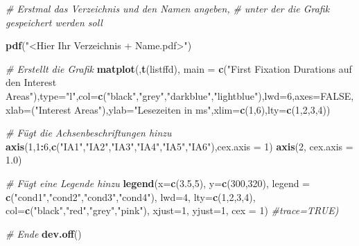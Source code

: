 \documentclass[]{book}
\newenvironment{Shaded}{\begin{snugshade}}{\end{snugshade}}
\newcommand{\KeywordTok}[1]{\textcolor[rgb]{0.13,0.29,0.53}{\textbf{#1}}}
\newcommand{\DataTypeTok}[1]{\textcolor[rgb]{0.13,0.29,0.53}{#1}}
\newcommand{\DecValTok}[1]{\textcolor[rgb]{0.00,0.00,0.81}{#1}}
\newcommand{\FloatTok}[1]{\textcolor[rgb]{0.00,0.00,0.81}{#1}}
\newcommand{\StringTok}[1]{\textcolor[rgb]{0.31,0.60,0.02}{#1}}
\newcommand{\CommentTok}[1]{\textcolor[rgb]{0.56,0.35,0.01}{\textit{#1}}}
\newcommand{\OtherTok}[1]{\textcolor[rgb]{0.56,0.35,0.01}{#1}}
\newcommand{\OperatorTok}[1]{\textcolor[rgb]{0.81,0.36,0.00}{\textbf{#1}}}
\newcommand{\NormalTok}[1]{#1}
\begin{document}
\begin{Shaded}
\begin{Highlighting}[]
\CommentTok{# Erstmal das Verzeichnis und den Namen angeben,}
\CommentTok{# unter der die Grafik gespeichert werden soll}

\KeywordTok{pdf}\NormalTok{(}\StringTok{"<Hier Ihr Verzeichnis + Name.pdf>"}\NormalTok{)}

\CommentTok{# Erstellt die Grafik}
\KeywordTok{matplot}\NormalTok{(,}\KeywordTok{t}\NormalTok{(listffd), }\DataTypeTok{main =} \KeywordTok{c}\NormalTok{(}\StringTok{"First Fixation Durations auf den Interest Areas"}\NormalTok{),}\DataTypeTok{type=}\StringTok{"l"}\NormalTok{,}\DataTypeTok{col=}\KeywordTok{c}\NormalTok{(}\StringTok{"black"}\NormalTok{,}\StringTok{"grey"}\NormalTok{,}\StringTok{"darkblue"}\NormalTok{,}\StringTok{"lightblue"}\NormalTok{),}\DataTypeTok{lwd=}\DecValTok{6}\NormalTok{,}\DataTypeTok{axes=}\OtherTok{FALSE}\NormalTok{,}\DataTypeTok{xlab=}\NormalTok{(}\StringTok{"Interest Areas"}\NormalTok{),}\DataTypeTok{ylab=}\StringTok{"Lesezeiten in ms"}\NormalTok{,}\DataTypeTok{xlim=}\KeywordTok{c}\NormalTok{(}\DecValTok{1}\NormalTok{,}\DecValTok{6}\NormalTok{),}\DataTypeTok{lty=}\KeywordTok{c}\NormalTok{(}\DecValTok{1}\NormalTok{,}\DecValTok{2}\NormalTok{,}\DecValTok{3}\NormalTok{,}\DecValTok{4}\NormalTok{))}

\CommentTok{# Fügt die Achsenbeschriftungen hinzu}
\KeywordTok{axis}\NormalTok{(}\DecValTok{1}\NormalTok{,}\DecValTok{1}\OperatorTok{:}\DecValTok{6}\NormalTok{,}\KeywordTok{c}\NormalTok{(}\StringTok{"IA1"}\NormalTok{,}\StringTok{"IA2"}\NormalTok{,}\StringTok{"IA3"}\NormalTok{,}\StringTok{"IA4"}\NormalTok{,}\StringTok{"IA5"}\NormalTok{,}\StringTok{"IA6"}\NormalTok{),}\DataTypeTok{cex.axis =} \DecValTok{1}\NormalTok{)}
\KeywordTok{axis}\NormalTok{(}\DecValTok{2}\NormalTok{, }\DataTypeTok{cex.axis =} \FloatTok{1.0}\NormalTok{)}

\CommentTok{# Fügt eine Legende hinzu}
\KeywordTok{legend}\NormalTok{(}\DataTypeTok{x=}\KeywordTok{c}\NormalTok{(}\FloatTok{3.5}\NormalTok{,}\DecValTok{5}\NormalTok{),}
       \DataTypeTok{y=}\KeywordTok{c}\NormalTok{(}\DecValTok{300}\NormalTok{,}\DecValTok{320}\NormalTok{),}
       \DataTypeTok{legend =} \KeywordTok{c}\NormalTok{(}\StringTok{"cond1"}\NormalTok{,}\StringTok{"cond2"}\NormalTok{,}\StringTok{"cond3"}\NormalTok{,}\StringTok{"cond4"}\NormalTok{),}
       \DataTypeTok{lwd=}\DecValTok{4}\NormalTok{,}
       \DataTypeTok{lty=}\KeywordTok{c}\NormalTok{(}\DecValTok{1}\NormalTok{,}\DecValTok{2}\NormalTok{,}\DecValTok{3}\NormalTok{,}\DecValTok{4}\NormalTok{),}
       \DataTypeTok{col=}\KeywordTok{c}\NormalTok{(}\StringTok{"black"}\NormalTok{,}\StringTok{"red"}\NormalTok{,}\StringTok{"grey"}\NormalTok{,}\StringTok{"pink"}\NormalTok{),}
       \DataTypeTok{xjust=}\DecValTok{1}\NormalTok{,}
       \DataTypeTok{yjust=}\DecValTok{1}\NormalTok{,}
       \DataTypeTok{cex =} \DecValTok{1}\NormalTok{)}
\CommentTok{#trace=TRUE)}

\CommentTok{# Ende}
\KeywordTok{dev.off}\NormalTok{()}
\end{Highlighting}
\end{Shaded}
\end{document}
